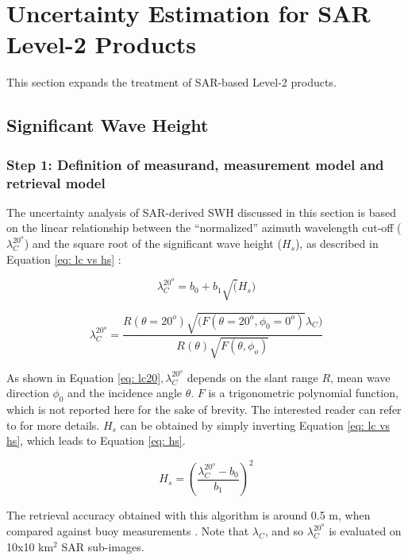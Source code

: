\section{Uncertainty Estimation for SAR Level-2 Products} \label{sec:level2}


This section expands the treatment of SAR-based Level-2 products.  

\subsection{Significant Wave Height}
\label{sec: SWH}

\subsubsection{Step 1: Definition of measurand, measurement model and retrieval model}
\label{sec: SWH model}

The uncertainty analysis of SAR-derived SWH discussed in this section is based on the linear relationship between the ``normalized'' azimuth wavelength cut-off ($\lambda_{C}^{20^{o}}$) and the
square root of the significant wave height ($H_{s}$), as described in Equation
\ref{eq: lc vs hs} \cite{GriecoIJRS2016}:

\begin{equation}
	\lambda_{C}^{20^{o}} = b_{0}+b_{1}\sqrt(H_{s})
	\label{eq: lc vs hs}
\end{equation}

\begin{equation}
   \lambda_{C}^{20^{o}} = \frac{R(\theta=20^{o})\sqrt{(F(\theta=20^{o},\phi_{0}=0^{o})}\lambda_{C})}{R(\theta)\sqrt{F(\theta,\phi_{o})}}
    \label{eq: lc20}
\end{equation}

As shown in Equation \ref{eq: lc20}$, \lambda^{20^{o}}_{C}$ depends on the slant range $R$, mean wave direction $\phi_{0}$ and the incidence angle $\theta$. $F$ is a trigonometric polynomial function, which is not reported here for the sake of brevity. The interested reader can refer to \cite{GriecoIJRS2016} for more details. 
$H_{s}$ can be obtained by simply inverting Equation \ref{eq: lc vs hs}, which leads to Equation \ref{eq: hs}.

\begin{equation}
	H_{s} = \left(\frac{\lambda^{20^{o}}_{C}-b_{0}}{b_{1}}\right)^{2}
	\label{eq: hs}
\end{equation}

The retrieval accuracy obtained with this algorithm is around 0.5 m, when compared against buoy measurements \cite{GriecoIJRS2016}. 
Note that $\lambda_{C}$, and so $\lambda_{C}^{20^{o}}$ is evaluated on 10x10 km$^{2}$ SAR sub-images.

